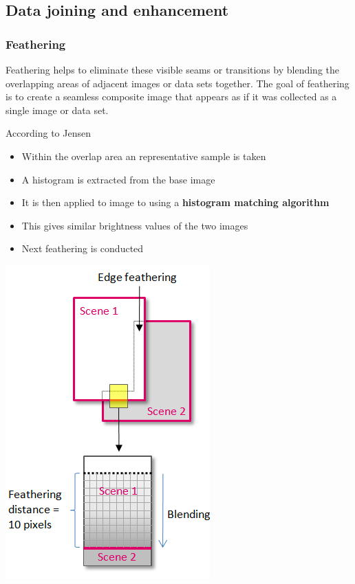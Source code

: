 \documentclass[
  letterpaper,
  DIV=11,
  numbers=noendperiod]{scrreprt}
\begin{document}
\hypertarget{data-joining-and-enhancement}{%
\subsection{Data joining and
enhancement}\label{data-joining-and-enhancement}}

\hypertarget{feathering}{%
\subsubsection{Feathering}\label{feathering}}

Feathering helps to eliminate these visible seams or transitions by
blending the overlapping areas of adjacent images or data sets together.
The goal of feathering is to create a seamless composite image that
appears as if it was collected as a single image or data set.

According to Jensen

\begin{itemize}
\item
  Within the overlap area an representative sample is taken
\item
  A histogram is extracted from the base image
\item
  It is then applied to image to using a \textbf{histogram matching
  algorithm}
\item
  This gives similar brightness values of the two images
\item
  Next feathering is conducted
\end{itemize}

\includegraphics{./images/paste-F98F079E.png}
\end{document}
